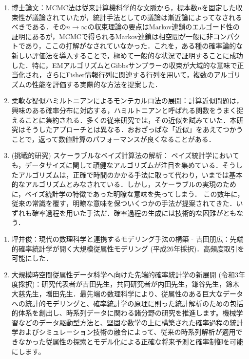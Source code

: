 \documentclass[uplatex,dvipdfmx]{jsreport}
\begin{document}
\begin{history}[鎌谷研吾]\mbox{}
    \begin{enumerate}
        \item \href{http://gakui.dl.itc.u-tokyo.ac.jp/data/h20/124166/124166b.pdf}{博士論文}：MCMC法は従来計算機科学的な文脈から，標本数$n$を固定した収束性が議論されていたが，統計手法としての議論は漸近論によってなされるべきである．その$n\to\infty$の収束理論の要点はMarkov連鎖のエルゴード性の証明にあるが，MCMCで得られるMarkov連鎖は相空間が一般に非コンパクトであり，ここの打解がなされていなかった．これを，ある種の確率論的な新しい評価法を導入することで，極めて一般的な状況で証明することに成功した．特に，EMアルゴリズムとGibbsサンプラーの収束が大域的な意味で正当化され，さらにFisher情報行列に関連する行列を用いて，複数のアルゴリズムの性能を評価する実際的な方法を提案した．
        \item 柔軟な疑似ハミルトニアンによるモンテカルロ法の展開：計算近似問題は，興味のある確率分布に対応する，ハミルトニアンと呼ばれる関数をうまく捉えることに集約される．多くの従来研究では，その近似を試みていた．本研究はそうしたアプローチとは異なる．おおざっぱな「近似」をあえてつかうことで，返って数値計算のパフォーマンスが良くなることがある．
        \item (挑戦的研究) スケーラブルなベイズ計算法の解析：	
        ベイズ統計学においても，データサイズに関して頑健なアルゴリズムが注目を集めている．そうしたアルゴリズムは，正確で時間のかかる手法に取って代わり，いまでは基本的なアルゴリズムとみなされている．しかし，スケーラブルの実現のために，ベイズ統計学の特徴であった明瞭な意味を失ってしまう．
        この数年に，従来の常識を覆す，明瞭な意味を保ついくつかの手法が提案されてきた．いずれも確率過程を用いた手法だ．確率過程の生成には技術的な困難がともなう．
    \end{enumerate}
\end{history}

\begin{history}[CREST]
    \begin{enumerate}
        \item 坪井俊：現代の数理科学と連携するモデリング手法の構築 - 吉田朋広：先端的確率統計学が開く大規模従属性モデリング (平成26年採択)．高頻度取引を可能にした．
        \item 大規模時空間従属性データ科学へ向けた先端的確率統計学の新展開 (令和3年度採択)：研究代表者が吉田先生，共同研究者が内田先生，鎌谷先生，鈴木大慈先生，増田先生．最先端の数理科学により、従属性のある巨大なデータへの統計的モデリングと、確率統計学の原理に則った統計解析のための包括的体系を創出し、時系列データに関わる諸分野の研究を推進します。機械学習などのデータ駆動型方法と、堅固な数学の上に構築された確率過程の統計学およびシミュレーション技術の融合によって、従来の時系列解析が適用できなかった従属性の探索とモデル化による正確な将来予測と確率制御を可能にします。
    \end{enumerate}
\end{history}
\end{document}
